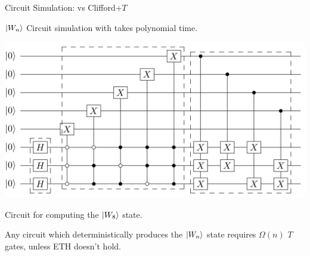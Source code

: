 \begin{frame}{Circuit Simulation: \limdd vs Clifford+$T$}

\begin{refsection}


\begin{theorem}%
 $\ket{W_n}$ Circuit simulation with \limdd takes polynomial time.
\end{theorem}

\centering
\includegraphics[width=0.8\linewidth]{pics/circuit-prepare-W-state-McClung.png}
\centering

\vspace{-.8em}

Circuit for computing the $\ket{W_8}$ state.

\vfill

\begin{theorem}
Any circuit which deterministically produces the
$\ket{W_n}$ state requires $\Omega(n)$ $T$ gates, unless ETH doesn't hold.
\end{theorem}

\vspace{-.5em}

\printbibliography[section=\therefsection]

\end{refsection}

\end{frame}





